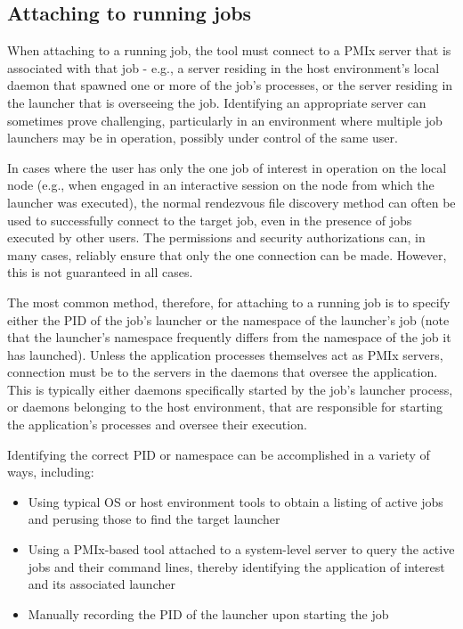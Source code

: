 \subsection{Attaching to running jobs}

When attaching to a running job, the tool must connect to a \ac{PMIx} server that is associated with that job - e.g., a server residing in the host environment's local daemon that spawned one or more of the job's processes, or the server residing in the launcher that is overseeing the job. Identifying an appropriate server can sometimes prove challenging, particularly in an environment where multiple job launchers may be in operation, possibly under control of the same user.

In cases where the user has only the one job of interest in operation on the local node (e.g., when engaged in an interactive session on the node from which the launcher was executed), the normal rendezvous file discovery method can often be used to successfully connect to the target job, even in the presence of jobs executed by other users. The permissions and security authorizations can, in many cases, reliably ensure that only the one connection can be made. However, this is not guaranteed in all cases.

The most common method, therefore, for attaching to a running job is to specify either the \ac{PID} of the job's launcher or the namespace of the launcher's job (note that the launcher's namespace frequently differs from the namespace of the job it has launched). Unless the application processes themselves act as \ac{PMIx} servers, connection must be to the servers in the daemons that oversee the application. This is typically either daemons specifically started by the job's launcher process, or daemons belonging to the host environment, that are responsible for starting the application's processes and oversee their execution.

Identifying the correct \ac{PID} or namespace can be accomplished in a variety of ways, including:

\begin{itemize}
    \item Using typical \ac{OS} or host environment tools to obtain a listing of active jobs and perusing those to find the target launcher
    \item Using a \ac{PMIx}-based tool attached to a system-level server to query the active jobs and their command lines, thereby identifying the application of interest and its associated launcher
    \item Manually recording the \ac{PID} of the launcher upon starting the job
\end{itemize}

